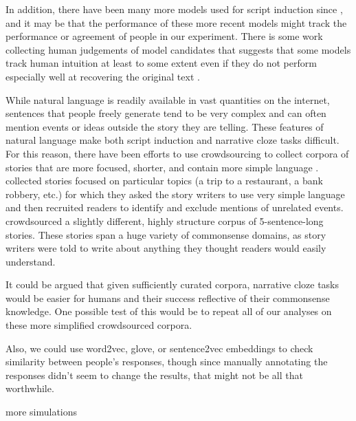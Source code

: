\documentclass[10pt,a4paper]{article}
\newcommand{\todo}[1]{{\color{red}#1}}
\begin{document}
In addition, there have been many more models used for script induction since , and it may be that the performance of these more recent models might track the performance or agreement of people in our experiment. There is some work collecting human judgements of model candidates that suggests that some models track human intuition at least to some extent even if they do not perform especially well at recovering the original text \cite{pichotta2016learning}.

While natural language is readily available in vast quantities on the internet, sentences that people freely generate tend to be very complex and can often mention events or ideas outside the story they are telling. These features of natural language make both script induction and narrative cloze tasks difficult. For this reason, there have been efforts to use crowdsourcing to collect corpora of stories that are more focused, shorter, and contain more simple language \cite{li2013story, mostafazadeh2016corpus}.  collected stories focused on particular topics (a trip to a restaurant, a bank robbery, etc.) for which they asked the story writers to use very simple language and then recruited readers to identify and exclude mentions of unrelated events.  crowdsourced a slightly different, highly structure corpus of 5-sentence-long stories. These stories span a huge variety of commonsense domains, as story writers were told to write about anything they thought readers would easily understand.

It could be argued that given sufficiently curated corpora, narrative cloze tasks would be easier for humans and their success reflective of their commonsense knowledge. One possible test of this would be to repeat all of our analyses on these more simplified crowdsourced corpora.

\todo{Also, we could use word2vec, glove, or sentence2vec embeddings to check similarity between people's responses, though since manually annotating the responses didn't seem to change the results, that might not be all that worthwhile.}

\todo{more simulations}


\end{document}
